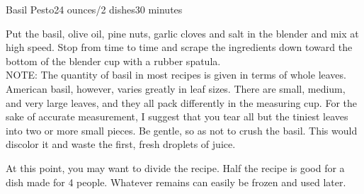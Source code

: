 \documentclass[../Cookbook.tex]{subfiles}
\begin{document}
\begin{recipe}[Pesto]{Basil Pesto}{24 ounces/2 dishes}{30 minutes}

Put the basil, olive oil, pine nuts, garlic cloves and salt in the blender and mix at high speed.
Stop from time to time and scrape the ingredients down toward the bottom of the blender cup with a rubber spatula.\\
NOTE: The quantity of basil in most recipes is given in terms of whole leaves.
American basil, however, varies greatly in leaf sizes.
There are small, medium, and very large leaves, and they all pack differently in the measuring cup.
For the sake of accurate measurement, I suggest that you tear all but the tiniest leaves into two or more small pieces.
Be gentle, so as not to crush the basil.  This would discolor it and waste the first, fresh droplets of juice.

\newstep
At this point, you may want to divide the recipe. Half the recipe is good for a dish made for 4 people. Whatever remains can easily be frozen and used later.


\end{recipe}
\end{document}

